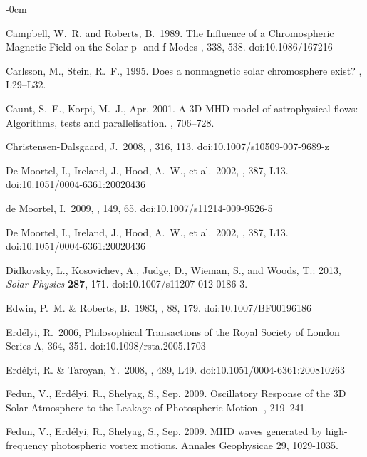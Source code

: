 \documentclass[physics,article,submit,pdftex,moreauthors]{Definitions/mdpi}
\begin{document}
\begin{adjustwidth}{-\extralength}{0cm}
\begin{thebibliography}{999}
 {Campbell}, W.~R. and {Roberts}, B.\ 1989. {The Influence of a Chromospheric Magnetic Field on the Solar p- and f-Modes} \apj, 338, 538. doi:10.1086/167216

{Carlsson}, M., {Stein}, R.~F., 1995. {Does a nonmagnetic solar chromosphere
  exist?} , L29--L32.

{Caunt}, S.~E., {Korpi}, M.~J., Apr. 2001. A {3D} {MHD} model of astrophysical
  flows: Algorithms, tests and parallelisation. , 706--728.

 Christensen-Dalsgaard, J.\ 2008, \apss, 316, 113. doi:10.1007/s10509-007-9689-z

 De Moortel, I., Ireland, J., Hood, A.~W., et al.\ 2002, \aap, 387, L13. doi:10.1051/0004-6361:20020436


 de Moortel, I.\ 2009, \ssr, 149, 65. doi:10.1007/s11214-009-9526-5

 De Moortel, I., Ireland, J., Hood, A.~W., et al.\ 2002, \aap, 387, L13. doi:10.1051/0004-6361:20020436

Didkovsky, L., Kosovichev, A., Judge, D., Wieman, S., and Woods, T.: 2013, {\it Solar Physics} {\bf 287}, 171. doi:10.1007/s11207-012-0186-3.


 Edwin, P.~M. \& Roberts, B.\ 1983, \solphys, 88, 179. doi:10.1007/BF00196186

 Erd{\'e}lyi, R.\ 2006, Philosophical Transactions of the Royal Society of London Series A, 364, 351. doi:10.1098/rsta.2005.1703

 Erd{\'e}lyi, R. \& Taroyan, Y.\ 2008, \aap, 489, L49. doi:10.1051/0004-6361:200810263

{Fedun}, V., {Erd{\'e}lyi}, R., {Shelyag}, S., Sep. 2009. {Oscillatory Response
  of the 3D Solar Atmosphere to the Leakage of Photospheric Motion}. , 219--241.

{Fedun}, V., {Erd{\'e}lyi}, R., {Shelyag}, S., Sep. 2009. {MHD waves generated by high-frequency photospheric vortex motions}. Annales Geophysicae
  29, 1029-1035.


\end{thebibliography}
\end{adjustwidth}
\end{document}
